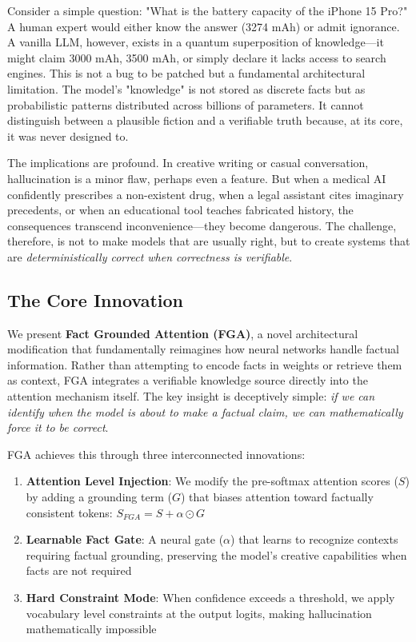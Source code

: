 \documentclass[11pt, a4paper]{article}
\theoremstyle{definition}
\begin{document}
Consider a simple question: "What is the battery capacity of the iPhone 15 Pro?" A human expert would either know the answer (3274 mAh) or admit ignorance. A vanilla LLM, however, exists in a quantum superposition of knowledge—it might claim 3000 mAh, 3500 mAh, or simply declare it lacks access to search engines. This is not a bug to be patched but a fundamental architectural limitation. The model's "knowledge" is not stored as discrete facts but as probabilistic patterns distributed across billions of parameters. It cannot distinguish between a plausible fiction and a verifiable truth because, at its core, it was never designed to.

The implications are profound. In creative writing or casual conversation, hallucination is a minor flaw, perhaps even a feature. But when a medical AI confidently prescribes a non-existent drug, when a legal assistant cites imaginary precedents, or when an educational tool teaches fabricated history, the consequences transcend inconvenience—they become dangerous. The challenge, therefore, is not to make models that are usually right, but to create systems that are \textit{deterministically correct when correctness is verifiable}.

\subsection{The Core Innovation}

We present \textbf{Fact Grounded Attention (FGA)}, a novel architectural modification that fundamentally reimagines how neural networks handle factual information. Rather than attempting to encode facts in weights or retrieve them as context, FGA integrates a verifiable knowledge source directly into the attention mechanism itself. The key insight is deceptively simple: \textit{if we can identify when the model is about to make a factual claim, we can mathematically force it to be correct}.

FGA achieves this through three interconnected innovations:

\begin{enumerate}
    \item \textbf{Attention Level Injection}: We modify the pre-softmax attention scores ($S$) by adding a grounding term ($G$) that biases attention toward factually consistent tokens: $S_{FGA} = S + \alpha \odot G$
    
    \item \textbf{Learnable Fact Gate}: A neural gate ($\alpha$) that learns to recognize contexts requiring factual grounding, preserving the model's creative capabilities when facts are not required
    
    \item \textbf{Hard Constraint Mode}: When confidence exceeds a threshold, we apply vocabulary level constraints at the output logits, making hallucination mathematically impossible
\end{enumerate}
\end{document}
